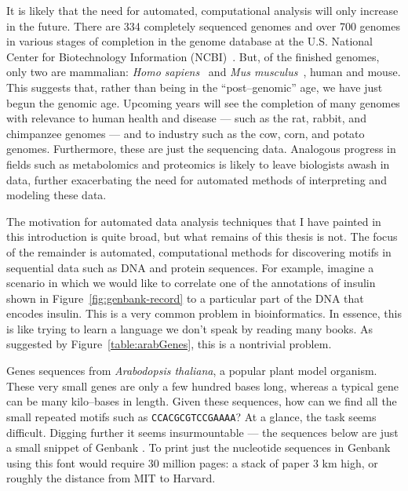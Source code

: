It is likely that the need for automated, computational analysis
will only increase in the future. There are 334 completely sequenced
genomes and over 700 genomes in various stages of completion in the
genome database at the U.S. National Center for Biotechnology
Information (NCBI)~\cite{wheeler2006database}. But, of the finished
genomes, only two are mammalian: \emph{Homo
sapiens}~\cite{venter2001sequence,lander2001initial} and \emph{Mus
musculus}~\cite{waterston2002initial}, human and mouse. This
suggests that, rather than being in the ``post--genomic'' age, we
have just begun the genomic age. Upcoming years will see the
completion of many genomes with relevance to human health and
disease --- such as the rat, rabbit, and chimpanzee genomes --- and
to industry such as the cow, corn, and potato genomes.  Furthermore,
these are just the sequencing data.  Analogous progress in fields
such as metabolomics and proteomics is likely to leave biologists
awash in data, further exacerbating the need for automated methods
of interpreting and modeling these data.


The motivation for automated data analysis techniques that I have
painted in this introduction is quite broad, but what remains of
this thesis is not. The focus of the remainder is automated,
computational methods for discovering motifs in sequential data such
as DNA and protein sequences.  For example, imagine a scenario in
which we would like to correlate one of the annotations of insulin
shown in Figure~\ref{fig:genbank-record} to a particular part of the
DNA that encodes insulin. This is a very common problem in
bioinformatics.  In essence, this is like trying to learn a language
we don't speak by reading many books.  As suggested by
Figure~\vref{table:arabGenes}, this is a nontrivial problem.


                \begin{table}[!hbtp]
                \centering
                \caption[Gene sequences from \emph{Arabodopsis thaliana}]{Genes sequences from \emph{Arabodopsis thaliana},
                a popular plant model organism.  These very small genes are only a
                few hundred bases long, whereas a typical gene can be many kilo--bases in length.
                Given these sequences, how can we find all the small repeated
                motifs such as \texttt{CCACGCGTCCGAAAA}?  At a glance, the task seems
                difficult.
                Digging further it seems insurmountable --- the
                sequences below are just a small snippet of Genbank .  To
                print just the nucleotide sequences in Genbank
                using this font would require 30 million pages: a stack of
                paper 3 km high, or roughly the distance from MIT to
                Harvard.}\label{table:arabGenes}
                    
                \end{table}

